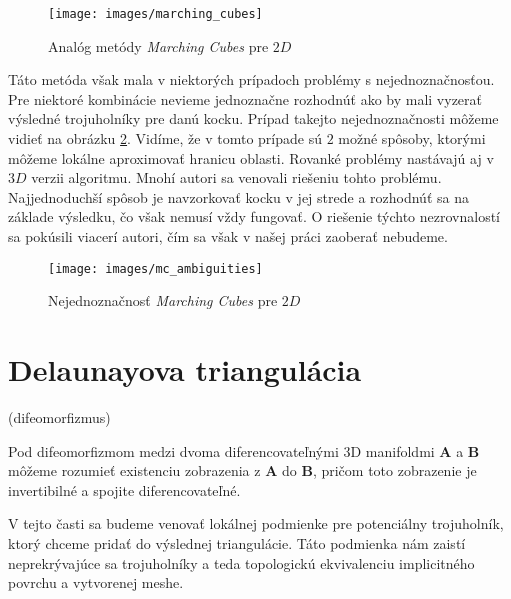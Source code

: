 \begin{figure}
    \centerline{\texttt{[image: images/marching\_cubes]}}
    \caption[Analóg metódy \textit{Marching Cubes} pre $2D$]{Analóg metódy \textit{Marching Cubes} pre $2D$}
    \label{obr:marching_cubes}
\end{figure}

Táto metóda však mala v niektorých prípadoch problémy s nejednoznačnosťou. Pre niektoré kombinácie
nevieme jednoznačne rozhodnúť ako by mali vyzerať výsledné trojuholníky pre danú kocku. Prípad takejto
nejednoznačnosti môžeme vidieť na obrázku \ref{obr:mc_ambiguities}. Vidíme, že v tomto prípade sú $2$ 
možné spôsoby, ktorými môžeme lokálne aproximovať hranicu oblasti. Rovanké problémy nastávajú aj v $3D$
verzii algoritmu. Mnohí autori sa venovali riešeniu tohto problému. Najjednoduchší spôsob je navzorkovať
kocku v jej strede a rozhodnúť sa na základe výsledku, čo však nemusí vždy fungovať. O riešenie týchto 
nezrovnalostí sa pokúsili viacerí autori, čím sa však v našej práci zaoberať nebudeme.

\begin{figure}
    \centerline{\texttt{[image: images/mc\_ambiguities]}}
    \caption[Nejednoznačnosť \textit{Marching Cubes} pre $2D$]{Nejednoznačnosť \textit{Marching Cubes} pre $2D$}
    \label{obr:mc_ambiguities}
\end{figure}



\section{Delaunayova triangulácia}
\label{kap:delaunay_triangulation}

\begin{note}
    (difeomorfizmus)

    Pod difeomorfizmom medzi dvoma diferencovateľnými 3D manifoldmi $\mathbf{A}$ a $\mathbf{B}$ 
    môžeme rozumieť existenciu zobrazenia z $\mathbf{A}$ do $\mathbf{B}$, pričom toto zobrazenie 
    je invertibilné a spojite diferencovateľné. 
\end{note}

V tejto časti sa budeme venovať lokálnej podmienke pre potenciálny trojuholník, ktorý chceme pridať do 
výslednej triangulácie. Táto podmienka nám zaistí neprekrývajúce sa trojuholníky a teda topologickú 
ekvivalenciu implicitného povrchu a vytvorenej meshe.

